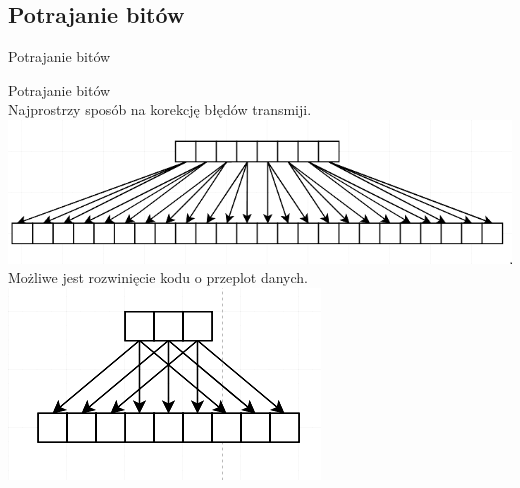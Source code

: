 \documentclass[12pt]{beamer}
\begin{document}
\subsection{Potrajanie bitów}
\begin{frame}{Potrajanie bitów}
\begin{center}
Potrajanie bitów\\
Najprostrzy sposób na korekcję błędów transmiji.
\includegraphics[scale= 0.25]{Potrajanie/potrajanie_proste.png}\\
Możliwe jest rozwinięcie kodu o przeplot danych.
\includegraphics[scale=0.25]{Potrajanie/potrajanie_przeplot.png}

\end{center}

\end{frame}
\end{document}

